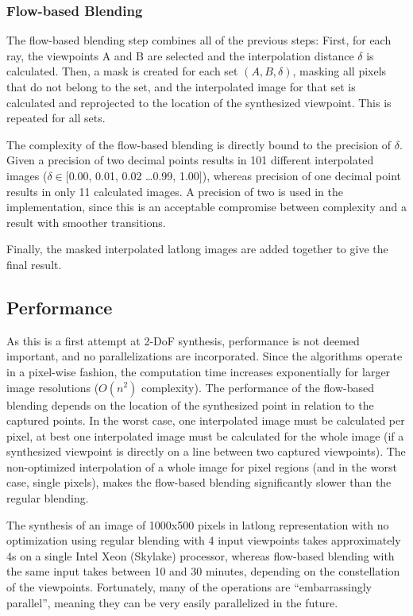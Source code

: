 \subsubsection{Flow-based Blending}
The flow-based blending step combines all of the previous steps: First, for each ray, the viewpoints A and B are selected and the interpolation distance $\delta$ is calculated. Then, a mask is created for each set $(A,B,\delta)$, masking all pixels that do not belong to the set, and the interpolated image for that set is calculated and reprojected to the location of the synthesized viewpoint. This is repeated for all sets.

The complexity of the flow-based blending is directly bound to the precision of $\delta$. Given a precision of two decimal points results in 101 different interpolated images ($\delta \in [$0.00, 0.01, 0.02 \ldots 0.99, 1.00$]$), whereas precision of one decimal point results in only 11 calculated images. A precision of two is used in the implementation, since this is an acceptable compromise between complexity and a result with smoother transitions.

Finally, the masked interpolated latlong images are added together to give the final result.

\subsection{Performance}
As this is a first attempt at 2-DoF synthesis, performance is not deemed important, and no parallelizations are incorporated. Since the algorithms operate in a pixel-wise fashion, the computation time increases exponentially for larger image resolutions ($O(n^2)$ complexity). The performance of the flow-based blending depends on the location of the synthesized point in relation to the captured points. In the worst case, one interpolated image must be calculated per pixel, at best one interpolated image must be calculated for the whole image (if a synthesized viewpoint is directly on a line between two captured viewpoints). The non-optimized interpolation of a whole image for pixel regions (and in the worst case, single pixels), makes the flow-based blending significantly slower than the regular blending.

The synthesis of an image of 1000x500 pixels in latlong representation with no optimization using regular blending with 4 input viewpoints takes approximately 4s on a single Intel Xeon (Skylake) processor, whereas flow-based blending with the same input takes between 10 and 30 minutes, depending on the constellation of the viewpoints.
Fortunately, many of the operations are ``embarrassingly parallel'', meaning they can be very easily parallelized in the future.

